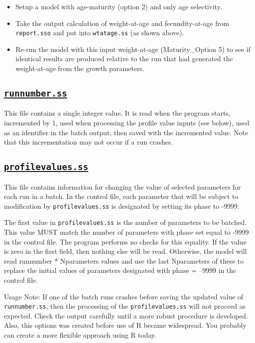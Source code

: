 		\begin{itemize}
			\item Setup a model with age-maturity (option 2) and only age selectivity.
			\item Take the output calculation of weight-at-age and fecundity-at-age  from \verb|report.sso| and put into \verb|wtatage.ss| (as shown above).
			\item Re-run the model with this input weight-at-age (Maturity\_Option 5) to see if identical results are produced relative to the run that had generated the weight-at-age from the growth parameters.
		\end{itemize}


\hypertarget{runnumber}{}
\subsection[\texttt{runnumber.ss}]{\protect\hyperlink{runnumber}{\texttt{runnumber.ss}}}
This file contains a single integer value. It is read when the program starts, incremented by 1, used when processing the profile value inputs (see below), used as an identifier in the batch output, then saved with the incremented value. Note that this incrementation may not occur if a run crashes.

\hypertarget{profilevalues}{}
\subsection[\texttt{profilevalues.ss}]{\protect\hyperlink{profilevalues}{\texttt{profilevalues.ss}}}
This file contains information for changing the value of selected parameters for each run in a batch. In the control file, each parameter that will be subject to modification by \texttt{profilevalues.ss} is designated by setting its phase to -9999.

The first value in \texttt{profilevalues.ss} is the number of parameters to be batched. This value MUST match the number of parameters with phase set equal to -9999 in the control file. The program performs no checks for this equality. If the value is zero in the first field, then nothing else will be read. Otherwise, the model will read runnumber * Nparameters values and use the last Nparameters of these to replace the initial values of parameters designated with phase = --9999 in the control file.

Usage Note: If one of the batch runs crashes before saving the updated value of \texttt{runnumber.ss}, then the processing of the \verb|profilevalues.ss| will not proceed as expected. Check the output carefully until a more robust procedure is developed. Also, this options was created before use of R became widespread. You probably can create a more flexible approach using R today.


\pagebreak